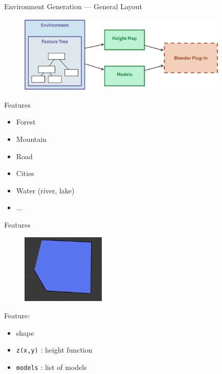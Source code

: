 \documentclass{beamer}
\begin{document}
\begin{frame}{Environment Generation --- General Layout}
  \begin{figure}
    \begin{center}
      \includegraphics[width=10cm]{env_global.pdf}
    \end{center}
  \end{figure}
\end{frame}

\begin{frame}{Features}
  \begin{itemize}
    \item Forest
    \item Mountain
    \item Road
    \item Cities
    \item Water (river, lake)
    \item ...
  \end{itemize}
\end{frame}

\begin{frame}{Features}
  \begin{figure}
    \begin{center}
      \includegraphics[width=4cm]{feature}
    \end{center}
  \end{figure}
  Feature:
  \begin{itemize}
    \item {\color{Cerulean}shape}
    \item \texttt{z(x,y)} : height function
    \item \texttt{models} : list of models
  \end{itemize}
\end{frame}
\end{document}
